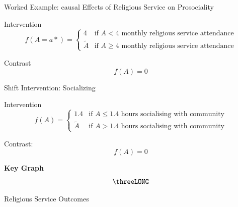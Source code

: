 \documentclass[
  ignorenonframetext,
  aspectratio=169,
]{beamer}
\begin{document}
\begin{frame}{Worked Example: causal Effects of Religious Service on
Prosociality}
\label{worked-example-causal-effects-of-religious-service-on-prosociality}
\begin{block}{Intervention}
\label{intervention}
\[f(A = a*) = \begin{cases} 4 & \text{if } A < 4  \text{ monthly religious service attendance} \\ \tilde{A} & \text{if } A \geq 4  \text{ monthly religious service attendance} \end{cases} \]
\end{block}

\begin{block}{Contrast}
\label{contrast}
\[f(A) = 0 \]
\end{block}
\end{frame}

\begin{frame}{Shift Intervention: Socializing}
\label{shift-intervention-socializing}
\begin{block}{Intervention}
\label{intervention-1}
\[f(A) = \begin{cases} 1.4 & \text{if } A \leq 1.4 \text{ hours socialising with community} \\ \tilde{A} & \text{if } A >  1.4  \text{ hours socialising with community}  \end{cases} \]
\end{block}

\begin{block}{Contrast:}
\label{contrast-1}
\[f(A) = 0 \]
\end{block}
\end{frame}

\begin{frame}{\textbf{Key Graph}}
\label{key-graph}
\[
\threeLONG
\]
\end{frame}

\begin{frame}{Religious Service Outcomes}
\label{religious-service-outcomes}
\end{frame}
\end{document}
